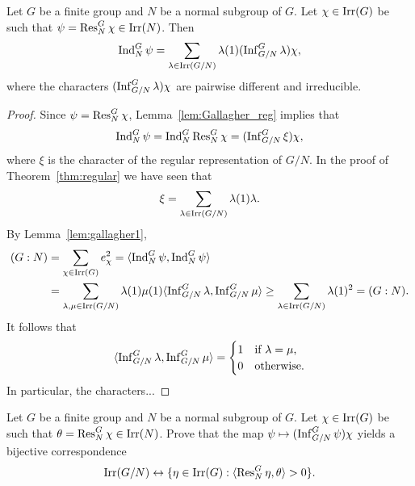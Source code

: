 \begin{theorem}[Gallagher]
\label{thm:Gallagher}
    Let $G$ be a finite group and $N$ be a normal subgroup of $G$. 
    Let $\chi\in\operatorname{Irr}(G)$ be such that $\psi=\operatorname{Res}_N^G\chi\in\operatorname{Irr}(N)$. Then
    \[
    \operatorname{Ind}_N^G\psi=\sum_{\lambda\in\operatorname{Irr}(G/N)}\lambda(1)(\operatorname{Inf}_{G/N}^G\lambda)\chi,
    \]
    where the characters $(\operatorname{Inf}_{G/N}^G\lambda)\chi$ are pairwise different and irreducible. 
\end{theorem}

\begin{proof}
    Since $\psi=\operatorname{Res}_N^G\chi$, Lemma~\ref{lem:Gallagher_reg} implies that 
    \[
    \operatorname{Ind}_N^G\psi=\operatorname{Ind}_N^G\operatorname{Res}_N^G\chi=(\operatorname{Inf}_{G/N}^G\xi)\chi,
    \]
    where $\xi$ is the character of the regular representation of $G/N$. In the proof
    of Theorem~\ref{thm:regular} we have seen that
    \[
    \xi=\sum_{\lambda\in\operatorname{Irr}(G/N)}\lambda(1)\lambda. 
    \]
    By Lemma~\ref{lem:gallagher1}, 
    \begin{align*}
        (G:N)&=\sum_{\chi\in\operatorname{Irr}(G)}e_\chi^2
        =\langle\operatorname{Ind}_N^G\psi,\operatorname{Ind}_N^G\psi\rangle\\
        &=\sum_{\lambda,\mu\in\operatorname{Irr}(G/N)}\lambda(1)\mu(1)\langle\operatorname{Inf}_{G/N}^G\lambda,\operatorname{Inf}_{G/N}^G\mu\rangle
        \geq\sum_{\lambda\in\operatorname{Irr}(G/N)}\lambda(1)^2=(G:N).        
    \end{align*}
    It follows that 
    \[
    \langle\operatorname{Inf}_{G/N}^G\lambda,\operatorname{Inf}_{G/N}^G\mu\rangle=\begin{cases}
        1 & \text{if $\lambda=\mu$,}\\
        0 & \text{otherwise.}
    \end{cases}
    \]
    In particular, the characters...
\end{proof}

\begin{exercise}
    Let $G$ be a finite group and $N$ be a normal subgroup of $G$. Let $\chi\in\operatorname{Irr}(G)$ 
    be such that $\theta=\operatorname{Res}_N^G\chi\in\operatorname{Irr}(N)$. Prove that the map 
    $\psi\mapsto(\operatorname{Inf}_{G/N}^G\psi)\chi$ yields 
    a bijective 
    correspondence 
    \[
    \operatorname{Irr}(G/N)\leftrightarrow\{\eta\in\operatorname{Irr}(G):\langle\operatorname{Res}_N^G\eta,\theta\rangle>0\}.
    \]
\end{exercise}